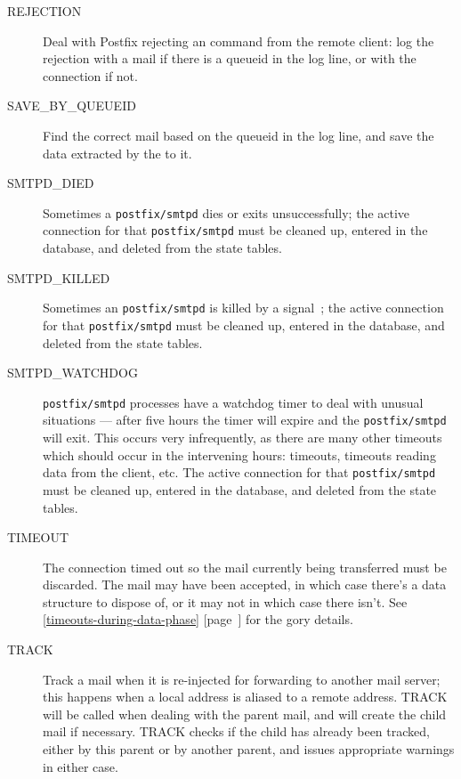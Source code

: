 \documentclass[a4paper,12pt,draft]{article}
\newcommand{\refwithpage}[1]{%
    \empty{}\ref{#1} [page~\pageref{#1}]%
}
\newcommand{\sectionref}[1]{%
    \textsection{}\refwithpage{#1}%
}
\newcommand{\daemon}[1]{%
    \texttt{postfix/#1}%
}
\begin{document}
\begin{description}
    \item [REJECTION] Deal with Postfix rejecting an \SMTP{} command from
        the remote client: log the rejection with a mail if there is a
        queueid in the log line, or with the connection if not.

    \item [SAVE\_BY\_QUEUEID] Find the correct mail based on the queueid in
        the log line, and save the data extracted by the \regex{} to it.

    \item [SMTPD\_DIED] Sometimes a \daemon{smtpd} dies or exits
        unsuccessfully; the active connection for that \daemon{smtpd} must
        be cleaned up, entered in the database, and deleted from the state
        tables.

    \item [SMTPD\_KILLED] Sometimes an \daemon{smtpd} is killed by a
        signal~\cite{Wikipedia-unix-signals}; the active connection for
        that \daemon{smtpd} must be cleaned up, entered in the database,
        and deleted from the state tables.

    \item [SMTPD\_WATCHDOG] \daemon{smtpd} processes have a watchdog timer
        to deal with unusual situations --- after five hours the timer will
        expire and the \daemon{smtpd} will exit.  This occurs very
        infrequently, as there are many other timeouts which should occur
        in the intervening hours: \DNS{} timeouts, timeouts reading data
        from the client, etc.  The active connection for that
        \daemon{smtpd} must be cleaned up, entered in the database, and
        deleted from the state tables.

    \item [TIMEOUT] The connection timed out so the mail currently being
        transferred must be discarded. The mail may have been accepted, in
        which case there's a data structure to dispose of, or it may not in
        which case there isn't.  See
        \sectionref{timeouts-during-data-phase} for the gory details.

    \item [TRACK] Track a mail when it is re-injected for forwarding to
        another mail server; this happens when a local address is aliased
        to a remote address.  TRACK will be called when dealing with the
        parent mail, and will create the child mail if necessary. TRACK
        checks if the child has already been tracked, either by this parent
        or by another parent, and issues appropriate warnings in either
        case.

\end{description}
\end{document}
